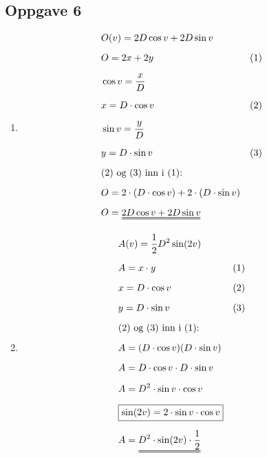 \documentclass[11pt,a4paper]{report}
\newcommand{\opgd}[1]{\item[#1)]}
\newcommand{\opg}[1]{\subsection*{Oppgave #1}}
\begin{document}
\newpage
\opg{6}
\begin{enumerate}[leftmargin=*,itemsep=0.75cm,labelsep=1.5em,label=\alph*)]
\opgd{a}
\begin{align*}
&O(v) = 2D \cos v + 2D \sin v\\[0.2cm]
&O = 2 x + 2 y &&(1)\\[0.2cm]
&\cos v = \frac{x}{D}\\[0.2cm]
&x = D \cdot \cos v &&(2)\\[0.2cm]
&\sin v = \frac{y}{D}\\[0.2cm]
&y = D \cdot \sin v &&(3)\\[0.2cm]
&\text{$(2)$ og $(3)$ inn i $(1)$:}\\[0.2cm]
&O = 2 \cdot (D \cdot \cos v) + 2 \cdot (D \cdot \sin v)\\[0.2cm]
&O = \uuline{2D \cos v + 2D \sin v}
\end{align*}
\opgd{b}
\begin{align*}
&A(v) = \frac{1}{2}D^2 \sin(2v)\\[0.2cm]
&A = x \cdot y &&(1)\\[0.2cm]
&x = D \cdot \cos v &&(2)\\[0.2cm]
&y = D \cdot \sin v &&(3)\\[0.2cm]
&\text{$(2)$ og $(3)$ inn i $(1)$:}\\[0.2cm]
&A = (D \cdot \cos v) (D \cdot \sin v)\\[0.2cm]
&A = D \cdot \cos v \cdot D \cdot \sin v\\[0.2cm]
&A = D^2 \cdot \sin v \cdot \cos v\\[0.2cm]
&\boxed{\sin(2v) = 2 \cdot \sin v \cdot \cos v}\\[0.2cm]
&A = \uuline{D^2 \cdot \sin(2v) \cdot \frac{1}{2}}\\[0.2cm]
\end{align*}
\end{enumerate}
\end{document}
